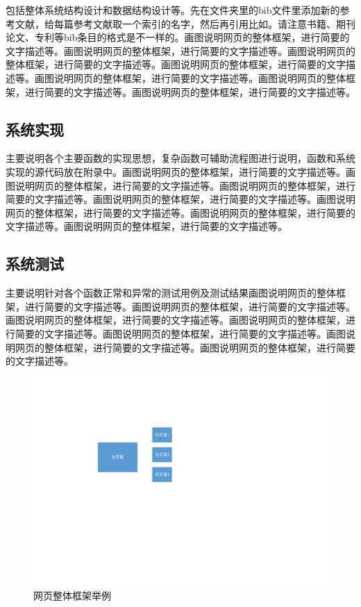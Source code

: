 \documentclass[supercite]{HustGraduPaper}
\theoremstyle{definition}
\begin{document}
    包括整体系统结构设计和数据结构设计等。先在文件夹里的bib文件里添加新的参考文献，给每篇参考文献取一个索引的名字，然后再引用比如\cite{STR2021Neurocom}\cite{AVS2021Neurocom, Rezaei2014CVPR}。请注意书籍、期刊论文、专利等bib条目的格式是不一样的。画图说明网页的整体框架，进行简要的文字描述等。画图说明网页的整体框架，进行简要的文字描述等。画图说明网页的整体框架，进行简要的文字描述等。画图说明网页的整体框架，进行简要的文字描述等。画图说明网页的整体框架，进行简要的文字描述等。画图说明网页的整体框架，进行简要的文字描述等。画图说明网页的整体框架，进行简要的文字描述等。

    \subsection{系统实现}

    主要说明各个主要函数的实现思想，复杂函数可辅助流程图进行说明，函数和系统实现的源代码放在附录中。画图说明网页的整体框架，进行简要的文字描述等。画图说明网页的整体框架，进行简要的文字描述等。画图说明网页的整体框架，进行简要的文字描述等。画图说明网页的整体框架，进行简要的文字描述等。画图说明网页的整体框架，进行简要的文字描述等。画图说明网页的整体框架，进行简要的文字描述等。画图说明网页的整体框架，进行简要的文字描述等。

    \subsection{系统测试}

    主要说明针对各个函数正常和异常的测试用例及测试结果画图说明网页的整体框架，进行简要的文字描述等。画图说明网页的整体框架，进行简要的文字描述等。画图说明网页的整体框架，进行简要的文字描述等。画图说明网页的整体框架，进行简要的文字描述等。画图说明网页的整体框架，进行简要的文字描述等。画图说明网页的整体框架，进行简要的文字描述等。画图说明网页的整体框架，进行简要的文字描述等。
    \begin{figure}[htb] %
        \begin{center}
            \includegraphics[scale=0.80]{images/1-1.pdf}
            \caption{网页整体框架举例}
            \label{fig1-1}
        \end{center}
    \end{figure}
\end{document}
